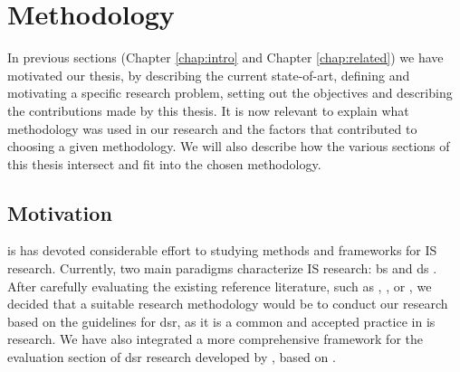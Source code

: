 \chapter{Methodology}

In previous sections (Chapter \ref{chap:intro} and Chapter \ref{chap:related}) we have motivated our thesis, by describing the current state-of-art, defining and motivating a specific research problem, setting out the objectives and describing the contributions made by this thesis. It is now relevant to explain what methodology was used in our research and the factors that contributed to choosing a given methodology. We will also describe how the various sections of this thesis intersect and fit into the chosen methodology.

\section{Motivation}

\gls{is} has devoted considerable effort to studying methods and frameworks for IS research. Currently, two main paradigms characterize IS research: \gls{bs} and \gls{ds} \cite[76]{hevner_design_2004}. After carefully evaluating the existing reference literature, such as \cite{hevner_design_2004}, \cite{march_design_1995}, \cite{winter_design_2008} or \cite{peffers_design_2007}, we decided that a suitable research methodology would be to conduct our research based on the guidelines for \gls{dsr}, as it is a common and accepted practice in \gls{is} research. We have also integrated a more comprehensive framework for the evaluation section of \gls{dsr} research \cite{10.1007/978-3-642-29863-9_31} developed by \citeauthor{10.1007/978-3-642-29863-9_31}, based on \cite{pries2008strategies}.

